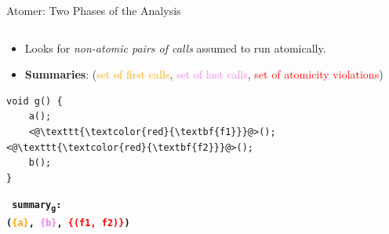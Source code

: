 \documentclass[%
    10pt, xcolor=pdflatex, hyperref={unicode}, aspectratio=169%
]{beamer}
\begin{document}
\begin{frame}[fragile]{Atomer: Two Phases of the Analysis}
\begin{columns}
\begin{column}[T]{.5 \linewidth}
            \begin{itemize}
                \item
                    Looks for \emph{non-atomic pairs of calls}
                    assumed to run atomically.

                \item
                    \textbf{Summaries}: (\textcolor{orange}{set of
                    first calls}, \textcolor{violet}{set of last
                    calls}, \textcolor{red}{set of atomicity
                    violations})
            \end{itemize}

            \begin{lstlisting}
void g() {
    a();
    <@\texttt{\textcolor{red}{\textbf{f1}}}@>(); <@\texttt{\textcolor{red}{\textbf{f2}}}@>();
    b();
}
            \end{lstlisting}

            \textbf{\texttt{\footnotesize
                \alert{summary\textsubscript{g}}: \\
                (\textcolor{orange}{\{a\}},
                \textcolor{violet}{\{b\}},
                \textcolor{red}{\{(f1, f2)\}})
            }}
        \end{column}
    \end{columns}
\end{frame}


\end{document}

